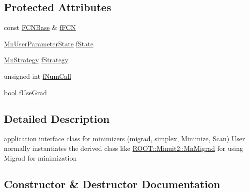 \subsection*{Protected Attributes}
\begin{DoxyCompactItemize}
\item 
const \mbox{\hyperlink{classROOT_1_1Minuit2_1_1FCNBase}{F\+C\+N\+Base}} \& \mbox{\hyperlink{classROOT_1_1Minuit2_1_1MnApplication_a3ea713844ff160f58da7e7d7897769fa}{f\+F\+CN}}
\item 
\mbox{\hyperlink{classROOT_1_1Minuit2_1_1MnUserParameterState}{Mn\+User\+Parameter\+State}} \mbox{\hyperlink{classROOT_1_1Minuit2_1_1MnApplication_a1bc33d1202bbcdfe3e757ff73f0b590e}{f\+State}}
\item 
\mbox{\hyperlink{classROOT_1_1Minuit2_1_1MnStrategy}{Mn\+Strategy}} \mbox{\hyperlink{classROOT_1_1Minuit2_1_1MnApplication_aac420948b2066e56f50db12e165ef60b}{f\+Strategy}}
\item 
unsigned int \mbox{\hyperlink{classROOT_1_1Minuit2_1_1MnApplication_ae28c000d63a6400d78fa6372ff4d7f13}{f\+Num\+Call}}
\item 
bool \mbox{\hyperlink{classROOT_1_1Minuit2_1_1MnApplication_ad9e1b4134667cb727d8344be83bf4ab7}{f\+Use\+Grad}}
\end{DoxyCompactItemize}


\subsection{Detailed Description}
application interface class for minimizers (migrad, simplex, Minimize, Scan) User normally instantiates the derived class like \mbox{\hyperlink{classROOT_1_1Minuit2_1_1MnMigrad}{R\+O\+O\+T\+::\+Minuit2\+::\+Mn\+Migrad}} for using Migrad for minimization 

\subsection{Constructor \& Destructor Documentation}
\mbox{\label{classROOT_1_1Minuit2_1_1MnApplication_ac3bea3d025068f8bc7d8a6701f23aa81}} 
